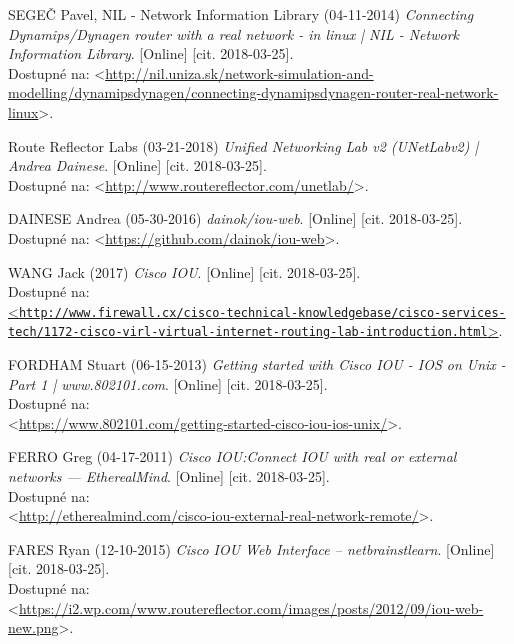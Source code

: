 \begin{thebibliography}{99}
SEGEČ Pavel, NIL - Network Information Library (04-11-2014) {\it Connecting Dynamips/Dynagen router with a real network - in linux | NIL - Network Information Library}. [Online] [cit. 2018-03-25]. \\ 
Dostupné na: <\url{http://nil.uniza.sk/network-simulation-and-modelling/dynamipsdynagen/connecting-dynamipsdynagen-router-real-network-linux}>.

Route Reflector Labs (03-21-2018) {\it Unified Networking Lab v2 (UNetLabv2) | Andrea Dainese}. [Online] [cit. 2018-03-25]. \\
Dostupné na: <\url{http://www.routereflector.com/unetlab/}>.

DAINESE Andrea (05-30-2016) {\it dainok/iou-web}. [Online] [cit. 2018-03-25]. \\
Dostupné na: <\url{https://github.com/dainok/iou-web}>.

WANG Jack (2017) {\it Cisco IOU}. [Online] [cit. 2018-03-25]. \\
Dostupné na: \\
\href{http://www.firewall.cx/cisco-technical-knowledgebase/cisco-services-tech/1172-cisco-virl-virtual-internet-routing-lab-introduction.html}{<\texttt{http://www.firewall.cx/cisco-technical-knowledgebase/cisco-services-\\tech/1172-cisco-virl-virtual-internet-routing-lab-introduction.html}>}.

FORDHAM Stuart (06-15-2013) {\it Getting started with Cisco IOU - IOS on Unix - Part 1 | www.802101.com}. [Online] [cit. 2018-03-25]. \\
Dostupné na: \\
<\url{https://www.802101.com/getting-started-cisco-iou-ios-unix/}>.

FERRO Greg (04-17-2011) {\it Cisco IOU:Connect IOU with real or external networks — EtherealMind}. [Online] [cit. 2018-03-25]. \\
Dostupné na: \\<\url{http://etherealmind.com/cisco-iou-external-real-network-remote/}>.

FARES Ryan (12-10-2015) {\it Cisco IOU Web Interface – netbrainstlearn}. [Online] [cit. 2018-03-25]. \\
Dostupné na: \\
<\url{https://i2.wp.com/www.routereflector.com/images/posts/2012/09/iou-web-new.png}>.


\end{thebibliography}
